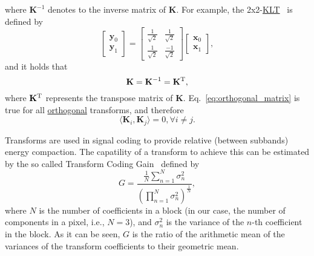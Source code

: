 where ${\mathbf{K}}^{-1}$ denotes to the inverse matrix of $\mathbf{K}$. For example, the
2x2-\href{https://en.wikipedia.org/wiki/Karhunen-Loeve_theorem}{KLT}~\cite{sayood2017introduction}
is defined by
\begin{equation}
  \begin{bmatrix}
    {\mathbf{y}}_0 \\
    {\mathbf{y}}_1
  \end{bmatrix}
  = 
  \begin{bmatrix} \frac{1}{\sqrt{2}} & \frac{1}{\sqrt{2}} \\ \frac{1}{\sqrt{2}} & \frac{-1}{\sqrt{2}} \end{bmatrix}
  \begin{bmatrix}
    {\mathbf{x}}_0 \\
    {\mathbf{x}}_1
  \end{bmatrix},
  \label{eq:KLT_transform}
\end{equation}
and it holds that
\begin{equation}
  \mathbf{K}={\mathbf{K}}^{-1}={\mathbf{K}}^{\text T},
  \label{eq:orthogonal_matrix}
\end{equation}
where ${\mathbf{K}}^{\text T}$ represents the transpose matrix of
$\mathbf{K}$.  Eq.~\ref{eq:orthogonal_matrix} is true for all
\href{https://en.wikipedia.org/wiki/Orthogonality}{orthogonal}
transforms, and therefore
\begin{equation}
  \langle {\mathbf{K}}_i, {\mathbf{K}}_j\rangle = 0, \forall i\neq j.
\end{equation}

Transforms are used in signal coding to provide relative (between
subbands) energy compaction. The capatility of a transform to
achieve this can be estimated by the so called Transform Coding
Gain~\cite{vetterli1995wavelets,sayood2017introduction} defined by
\begin{equation}
G = \frac{\frac{1}{N}\sum_{n=1}^N{\sigma_n^2}}{(\prod_{n=1}^N\sigma_n^2)^{\frac{1}{N}}},
\end{equation}
where $N$ is the number of coefficients in a block (in our case, the
number of components in a pixel, i.e., $N=3$), and $\sigma_n^2$ is the
variance of the $n$-th coefficient in the block. As it can be seen,
$G$ is the ratio of the arithmetic mean of the variances of the
transform coefficients to their geometric mean.

